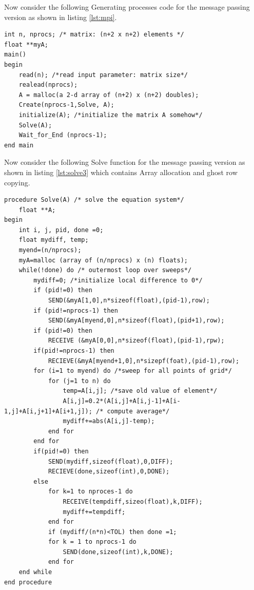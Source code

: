 \documentclass[12pt]{article}
\begin{document}
Now consider the following Generating processes code for the message passing version as shown in listing \ref{lst:mpi}.
\begin{lstlisting}[caption={Message Passing Version - Generating Processes},captionpos=b,label={lst:mpi}]
int n, nprocs; /* matrix: (n+2 x n+2) elements */
float **myA;
main()
begin
    read(n); /*read input parameter: matrix size*/
    realead(nprocs);
    A = malloc(a 2-d array of (n+2) x (n+2) doubles);
    Create(nprocs-1,Solve, A);
    initialize(A); /*initialize the matrix A somehow*/
    Solve(A);
    Wait_for_End (nprocs-1);
end main
\end{lstlisting}

Now consider the following Solve function for the message passing version as shown in listing \ref{lst:solve3}
which contains Array allocation and ghost row copying.
\begin{lstlisting}[caption={MPI - Solve Function},captionpos=b,label={lst:solve3}]
procedure Solve(A) /* solve the equation system*/
    float **A;
begin
    int i, j, pid, done =0;
    float mydiff, temp;
    myend=(n/nprocs);
    myA=malloc (array of (n/nprocs) x (n) floats);
    while(!done) do /* outermost loop over sweeps*/
        mydiff=0; /*initialize local difference to 0*/
        if (pid!=0) then
            SEND(&myA[1,0],n*sizeof(float),(pid-1),row);
        if (pid!=nprocs-1) then
            SEND(&myA[myend,0],n*sizeof(float),(pid+1),row);
        if (pid!=0) then
            RECEIVE (&myA[0,0],n*sizeof(float),(pid-1),rpw);
        if(pid!=nprocs-1) then
            RECIEVE(&myA[myend+1,0],n*sizepf(foat),(pid-1),row);
        for (i=1 to myend) do /*sweep for all points of grid*/
            for (j=1 to n) do
                temp=A[i,j]; /*save old value of element*/
                A[i,j]=0.2*(A[i,j]+A[i,j-1]+A[i-1,j]+A[i,j+1]+A[i+1,j]); /* compute average*/
                mydiff+=abs(A[i,j]-temp);
            end for
        end for
        if(pid!=0) then
            SEND(mydiff,sizeof(float),0,DIFF);
            RECIEVE(done,sizeof(int),0,DONE);
        else
            for k=1 to nproces-1 do
                RECEIVE(tempdiff,sizeo(float),k,DIFF);
                mydiff+=tempdiff;
            end for
            if (mydiff/(n*n)<TOL) then done =1;
            for k = 1 to nprocs-1 do
                SEND(done,sizeof(int),k,DONE);
            end for
    end while
end procedure
\end{lstlisting}
\end{document}
